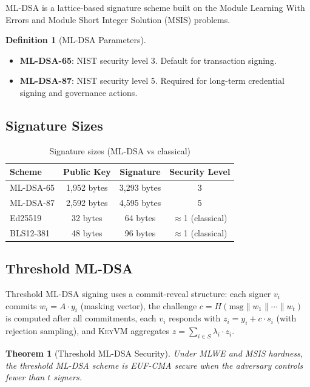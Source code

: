 \documentclass[11pt,letterpaper]{article}
\newtheorem{theorem}{Theorem}
\theoremstyle{definition}
\newtheorem{definition}{Definition}
\theoremstyle{remark}
\newcommand{\KeyVM}{\textsc{KeyVM}}
\begin{document}
ML-DSA is a lattice-based signature scheme built on the Module Learning With Errors and Module Short Integer Solution (MSIS) problems.

\begin{definition}[ML-DSA Parameters]
\begin{itemize}
\item \textbf{ML-DSA-65}: NIST security level 3. Default for transaction signing.
\item \textbf{ML-DSA-87}: NIST security level 5. Required for long-term credential signing and governance actions.
\end{itemize}
\end{definition}

\subsection{Signature Sizes}

\begin{table}[h]
\centering
\begin{tabular}{lccc}
\toprule
\textbf{Scheme} & \textbf{Public Key} & \textbf{Signature} & \textbf{Security Level} \\
\midrule
ML-DSA-65 & 1,952 bytes & 3,293 bytes & 3 \\
ML-DSA-87 & 2,592 bytes & 4,595 bytes & 5 \\
Ed25519 & 32 bytes & 64 bytes & $\approx$1 (classical) \\
BLS12-381 & 48 bytes & 96 bytes & $\approx$1 (classical) \\
\bottomrule
\end{tabular}
\caption{Signature sizes (ML-DSA vs classical)}
\label{tab:dsa-sizes}
\end{table}

\subsection{Threshold ML-DSA}

Threshold ML-DSA signing uses a commit-reveal structure: each signer $v_i$ commits $w_i = A \cdot y_i$ (masking vector), the challenge $c = H(\text{msg} \| w_1 \| \cdots \| w_t)$ is computed after all commitments, each $v_i$ responds with $z_i = y_i + c \cdot s_i$ (with rejection sampling), and \KeyVM{} aggregates $z = \sum_{i \in S} \lambda_i \cdot z_i$.

\begin{theorem}[Threshold ML-DSA Security]
Under MLWE and MSIS hardness, the threshold ML-DSA scheme is EUF-CMA secure when the adversary controls fewer than $t$ signers.
\end{theorem}
\end{document}
